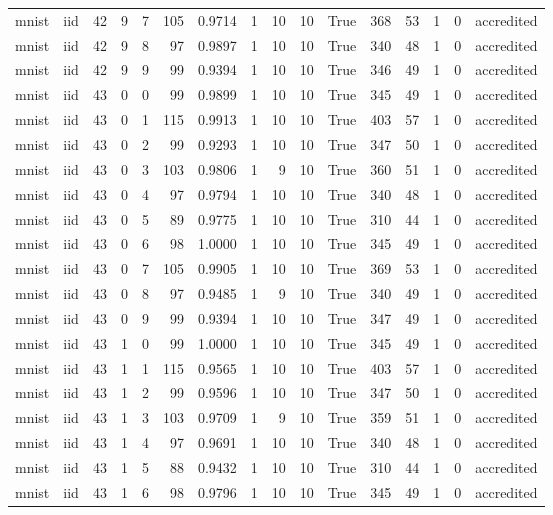 \begin{tabular}{llrrrrrrrrrrrrrl}
mnist & iid & 42 & 9 & 7 & 105 & 0.9714 & 1 & 10 & 10 & True & 368 & 53 & 1 & 0 & accredited \\
mnist & iid & 42 & 9 & 8 & 97 & 0.9897 & 1 & 10 & 10 & True & 340 & 48 & 1 & 0 & accredited \\
mnist & iid & 42 & 9 & 9 & 99 & 0.9394 & 1 & 10 & 10 & True & 346 & 49 & 1 & 0 & accredited \\
mnist & iid & 43 & 0 & 0 & 99 & 0.9899 & 1 & 10 & 10 & True & 345 & 49 & 1 & 0 & accredited \\
mnist & iid & 43 & 0 & 1 & 115 & 0.9913 & 1 & 10 & 10 & True & 403 & 57 & 1 & 0 & accredited \\
mnist & iid & 43 & 0 & 2 & 99 & 0.9293 & 1 & 10 & 10 & True & 347 & 50 & 1 & 0 & accredited \\
mnist & iid & 43 & 0 & 3 & 103 & 0.9806 & 1 & 9 & 10 & True & 360 & 51 & 1 & 0 & accredited \\
mnist & iid & 43 & 0 & 4 & 97 & 0.9794 & 1 & 10 & 10 & True & 340 & 48 & 1 & 0 & accredited \\
mnist & iid & 43 & 0 & 5 & 89 & 0.9775 & 1 & 10 & 10 & True & 310 & 44 & 1 & 0 & accredited \\
mnist & iid & 43 & 0 & 6 & 98 & 1.0000 & 1 & 10 & 10 & True & 345 & 49 & 1 & 0 & accredited \\
mnist & iid & 43 & 0 & 7 & 105 & 0.9905 & 1 & 10 & 10 & True & 369 & 53 & 1 & 0 & accredited \\
mnist & iid & 43 & 0 & 8 & 97 & 0.9485 & 1 & 9 & 10 & True & 340 & 49 & 1 & 0 & accredited \\
mnist & iid & 43 & 0 & 9 & 99 & 0.9394 & 1 & 10 & 10 & True & 347 & 49 & 1 & 0 & accredited \\
mnist & iid & 43 & 1 & 0 & 99 & 1.0000 & 1 & 10 & 10 & True & 345 & 49 & 1 & 0 & accredited \\
mnist & iid & 43 & 1 & 1 & 115 & 0.9565 & 1 & 10 & 10 & True & 403 & 57 & 1 & 0 & accredited \\
mnist & iid & 43 & 1 & 2 & 99 & 0.9596 & 1 & 10 & 10 & True & 347 & 50 & 1 & 0 & accredited \\
mnist & iid & 43 & 1 & 3 & 103 & 0.9709 & 1 & 9 & 10 & True & 359 & 51 & 1 & 0 & accredited \\
mnist & iid & 43 & 1 & 4 & 97 & 0.9691 & 1 & 10 & 10 & True & 340 & 48 & 1 & 0 & accredited \\
mnist & iid & 43 & 1 & 5 & 88 & 0.9432 & 1 & 10 & 10 & True & 310 & 44 & 1 & 0 & accredited \\
mnist & iid & 43 & 1 & 6 & 98 & 0.9796 & 1 & 10 & 10 & True & 345 & 49 & 1 & 0 & accredited \\

\end{tabular}
